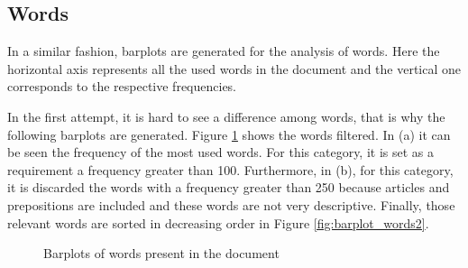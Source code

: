 \documentclass[10pt,leter,openany]{article}
\begin{document}
\newpage

\subsection{Words}	
	In a similar fashion, barplots are generated for the analysis of words. Here the horizontal axis represents all the used words in the document and the vertical one corresponds to the respective frequencies.

	In the first attempt, it is hard to see a difference among words, that is why the following barplots are generated. Figure \ref{fig:barplot_words1} shows the words filtered. In (a)  it can be seen the frequency of the most used words. For this category, it is set as a requirement a frequency greater than 100. Furthermore, in (b), for this category, it is discarded the words with a frequency greater than 250 because articles and prepositions are included and these words are not very descriptive. Finally, those relevant words are sorted in decreasing order in Figure \ref{fig:barplot_words2}.

		\begin{figure}
		\centering
		
		\caption{Barplots of words present in the document} \label{fig:barplot_words1}
	\end{figure}
\end{document}
